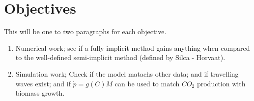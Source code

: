 \section{Objectives}

This will be one to two paragraphs for each objective.

\begin{enumerate}
  \item Numerical work; see if a fully implicit method gains anything when compared to the well-defined semi-implicit method (defined by Silca - Horvaat).
  \item Simulation work; Check if the model matachs other data; and if travelling waves exist; and if $\dot{p} = g(C)M$ can be used to match $CO_2$ production with biomass growth.
\end{enumerate}
